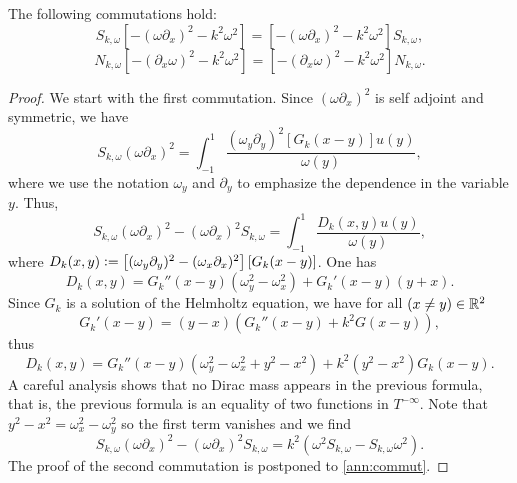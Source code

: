 \documentclass[a4paper]{article}
\begin{document}
	\begin{The}
		\label{Commutations}
		The following commutations hold:
		\[S_{k,\omega} \left[-(\omega \partial_x)^2 - k^2\omega^2\right] =  \left[-(\omega \partial_x)^2 - k^2\omega^2\right]S_{k,\omega},\]
		\[N_{k,\omega} \left[-(\partial_x \omega)^2 - k^2\omega^2\right] =  \left[-(\partial_x \omega)^2 - k^2\omega^2\right]N_{k,\omega}.\]
		\begin{proof}
			We start with the first commutation. Since $(\omega \partial_x)^2$ is self adjoint and symmetric, we have 
			\[S_{k,\omega} (\omega \partial_x)^2 = \int_{-1}^{1} \frac{(\omega_y \partial_y)^2 \left[G_k(x-y)\right] u(y)}{\omega(y)},\]
			where we use the notation $\omega_y$ and $\partial_y$ to emphasize the dependence in the variable $y$. 
			Thus, 
			\[S_{k,\omega} (\omega \partial_x)^2 - (\omega \partial_x)^2 S_{k,\omega} = \int_{-1}^{1} \frac{D_k(x,y)u(y)}{\omega(y)},\]
			where $D_k(x,y) \mathrel{\mathop:}= \left[(\omega_y \partial_y)^2 - (\omega_x \partial_x)^2\right] \left[G_k(x-y)\right]$. 
			One has 
			\[D_k(x,y) = G_k''(x-y) (\omega^2_y - \omega^2_x) + G_k'(x-y)(y + x).\]
			Since $G_k$ is a solution of the Helmholtz equation, we have for all $(x \neq y) \in \mathbb{R}^2$ 
			\[G_k'(x-y) = (y-x)(G_k''(x-y) + k^2G(x-y)),\]
			thus
			\[D_k(x,y) = G_k''(x-y)\left(\omega^2_y - \omega_x^2 + y^2 - x^2\right) + k^2(y^2 - x^2)G_k(x-y) . \]
			A careful analysis shows that no Dirac mass appears in the previous formula, that is, the previous formula is an equality of two functions in $T^{-\infty}$. 
			Note that $y^2 - x^2 = \omega_x^2 - \omega_y^2$ so the first term vanishes and we find
			\[S_{k,\omega} (\omega \partial_x)^2 - (\omega \partial_x)^2 S_{k,\omega} =  k^2\left(\omega^2 S_{k,\omega} -S_{k,\omega} \omega^2 \right). \]
			The proof of the second commutation is postponed to \autoref{ann:commut}. 
		\end{proof}
	\end{The}
	
\end{document}
